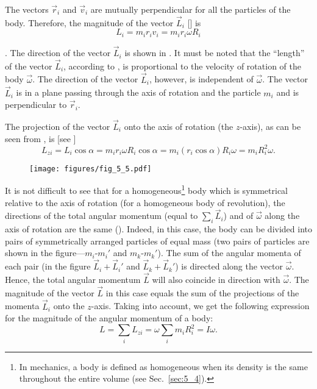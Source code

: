 \noindent
The vectors $\vec{r}_i$ and $\vec{v}_i$ are mutually perpendicular for all the particles of the body. Therefore, the magnitude of the vector $\vec{L}_i$ [] is
\begin{equation}\label{eq:5_8}
L_i = m_i r_i v_i = m_i r_i \omega R_i
\end{equation}

. The direction of the vector $\vec{L}_i$ is shown in . It must be noted that the ``length'' of the vector $\vec{L}_i$, according to , is proportional to the velocity of rotation of the body $\vec{\omega}$. The direction of the vector $\vec{L}_i$, however, is independent of $\vec{\omega}$. The vector $\vec{L}_i$ is in a plane passing through the axis of rotation and the particle $m_i$ and is perpendicular to $\vec{r}_i$.

The projection of the vector $\vec{L}_i$ onto the axis of rotation (the $z$-axis), as can be seen from , is [see ]
\begin{equation}\label{eq:5_9}
L_{zi} = L_i\cos\alpha = m_i r_i \omega R_i \cos\alpha = m_i(r_i\cos\alpha)R_i\omega = m_iR_i^2\omega.
\end{equation}

\begin{figure}[t]
	\begin{center}
		\texttt{[image: figures/fig\_5\_5.pdf]}
		\caption[]{}
		\label{fig:5_5}
	\end{center}
\vspace{-1.0cm}
\end{figure}

It is not difficult to see that for a homogeneous\footnote{In mechanics, a body is defined as homogeneous when its density is the same throughout the entire volume (see Sec.~\ref{sec:5_4}).} body which is symmetrical relative to the axis of rotation (for a homogeneous body of revolution), the directions of the total angular momentum (equal to $\sum_i\vec{L}_i$) and of $\vec{\omega}$ along the axis of rotation are the same (). Indeed, in this case, the body can be divided into pairs of symmetrically arranged particles of equal mass (two pairs of particles are shown in the figure---$m_i$-$m_i'$ and $m_k$-$m_k'$). The sum of the angular momenta of each pair (in the figure $\vec{L}_i+\vec{L}_i'$ and $\vec{L}_k+\vec{L}_k'$) is directed along the vector $\vec{\omega}$. Hence, the total angular momentum $\vec{L}$ will also coincide in direction with $\vec{\omega}$. The magnitude of the vector $\vec{L}$ in this case equals the sum of the projections of the momenta $\vec{L}_i$ onto the $z$-axis. Taking  into account, we get the following expression for the magnitude of the angular momentum of a body:
\begin{equation}\label{eq:5_10}
L = \sum_i L_{zi} = \omega \sum_i m_i R_i^2 = I \omega.
\end{equation}

